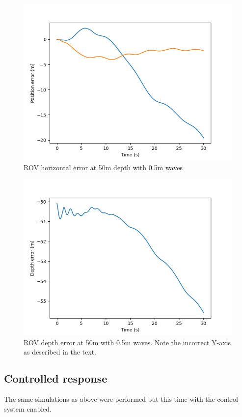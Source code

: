 \documentclass[class=article, crop=false]{standalone}
\begin{document}
\begin{figure}
    \centering
    \includegraphics{scenario1/rov-50m/0.5m/rov_position_error_uncontrolled}
    \caption{ROV horizontal error at 50m depth with 0.5m waves}
    \label{fig:rov_xy_error}
\end{figure}

\begin{figure}
    \centering
    \includegraphics{scenario1/rov-50m/0.5m/rov_depth_error_uncontrolled}
    \caption{ROV depth error at 50m with 0.5m waves. Note the incorrect Y-axis as described in the text.}
\end{figure}



\subsection{Controlled response}
The same simulations as above were performed but this time with the control system enabled.
\end{document}
